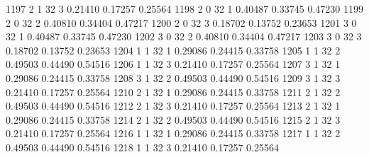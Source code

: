 \documentclass{article}
\begin{document}
\begin{Woutput}
1197      2       1      32       3       0.21410    0.17257    0.25564
1198      2       0      32       1       0.40487    0.33745    0.47230
1199      2       0      32       2       0.40810    0.34404    0.47217
1200      2       0      32       3       0.18702    0.13752    0.23653
1201      3       0      32       1       0.40487    0.33745    0.47230
1202      3       0      32       2       0.40810    0.34404    0.47217
1203      3       0      32       3       0.18702    0.13752    0.23653
1204      1       1      32       1       0.29086    0.24415    0.33758
1205      1       1      32       2       0.49503    0.44490    0.54516
1206      1       1      32       3       0.21410    0.17257    0.25564
1207      3       1      32       1       0.29086    0.24415    0.33758
1208      3       1      32       2       0.49503    0.44490    0.54516
1209      3       1      32       3       0.21410    0.17257    0.25564
1210      2       1      32       1       0.29086    0.24415    0.33758
1211      2       1      32       2       0.49503    0.44490    0.54516
1212      2       1      32       3       0.21410    0.17257    0.25564
1213      2       1      32       1       0.29086    0.24415    0.33758
1214      2       1      32       2       0.49503    0.44490    0.54516
1215      2       1      32       3       0.21410    0.17257    0.25564
1216      1       1      32       1       0.29086    0.24415    0.33758
1217      1       1      32       2       0.49503    0.44490    0.54516
1218      1       1      32       3       0.21410    0.17257    0.25564


\end{Woutput}
\end{document}
